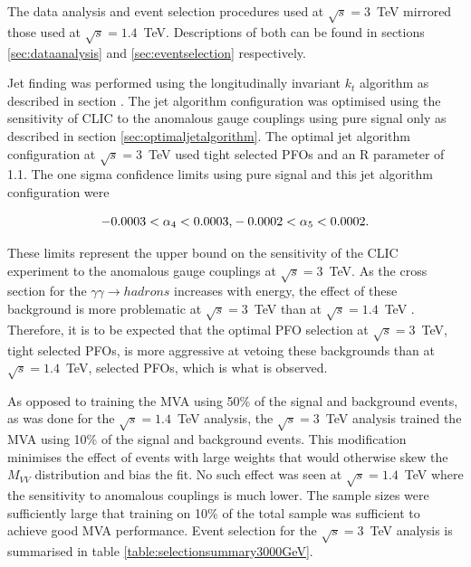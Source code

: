 The data analysis and event selection procedures used at $\sqrt{s}=3$~TeV mirrored those used at $\sqrt{s}=1.4$~TeV.  Descriptions of both can be found in sections \ref{sec:dataanalysis} and \ref{sec:eventselection} respectively.  

Jet finding was performed using the longitudinally invariant $k_{t}$ algorithm as described in section \label{sec:jetpairing}.  The jet algorithm configuration was optimised using the sensitivity of CLIC to the anomalous gauge couplings using pure signal only as described in section \ref{sec:optimaljetalgorithm}.  The optimal jet algorithm configuration at $\sqrt{s}=3$~TeV used tight selected PFOs and an R parameter of 1.1.  The one sigma confidence limits using pure signal and this jet algorithm configuration were 

\begin{equation}
-0.0003 < \alpha_{4} < 0.0003 \text{,} \\
-0.0002 < \alpha_{5} < 0.0002 \text{.}
\end{equation}

\noindent These limits represent the upper bound on the sensitivity of the CLIC experiment to the anomalous gauge couplings at $\sqrt{s}=3$~TeV.  As the cross section for the $\gamma\gamma \rightarrow hadrons$ increases with energy, the effect of these background is more problematic at $\sqrt{s}=3$~TeV than at $\sqrt{s}=1.4$~TeV \cite{arXiv:1209.4039}.  Therefore, it is to be expected that the optimal PFO selection at $\sqrt{s}=3$~TeV, tight selected PFOs, is more aggressive at vetoing these backgrounds than at $\sqrt{s}=1.4$~TeV, selected PFOs, which is what is observed.  

As opposed to training the MVA using 50\% of the signal and background events, as was done for the $\sqrt{s}=1.4$~TeV analysis, the $\sqrt{s}=3$~TeV analysis trained the MVA using 10\% of the signal and background events.  This modification minimises the effect of events with large weights that would otherwise skew the $M_{VV}$ distribution and bias the fit.  No such effect was seen at $\sqrt{s}=1.4$~TeV where the sensitivity to anomalous couplings is much lower.  The sample sizes were sufficiently large that training on 10\% of the total sample was sufficient to achieve good MVA performance.  Event selection for the $\sqrt{s}=3$~TeV analysis is summarised in table \ref{table:selectionsummary3000GeV}.

